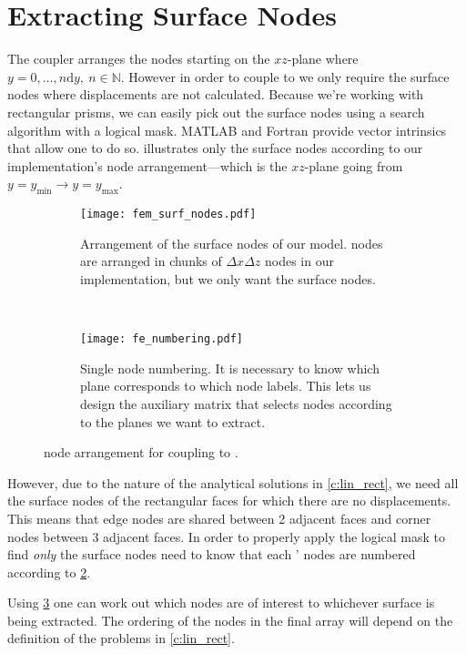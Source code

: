 \section{Extracting Surface Nodes}
The  coupler arranges the nodes starting on the $ xz $-plane where $ y = 0, \ldots, n \mathrm{d}y,~n\in \mathbb{N} $. However in order to couple  to  we only require the surface nodes where displacements are not calculated. Because we're working with rectangular prisms, we can easily pick out the surface nodes using a search algorithm with a logical mask. MATLAB and Fortran provide vector intrinsics that allow one to do so.  illustrates only the surface nodes according to our implementation's node arrangement---which is the $ xz $-plane going from $ y = y_{\textrm{min}} \to y = y_{\textrm{max}} $.
\begin{figure}
	\centering
	\begin{subfigure}[b]{0.45\linewidth}
		\centering
		\texttt{[image: fem\_surf\_nodes.pdf]}
		\caption[Surface nodes of our  model.]{Arrangement of the surface nodes of our  model.  nodes are arranged in chunks of $ \Delta x \Delta z $ nodes in our implementation, but we only want the surface nodes.}
		\label{f:fem_surf_nodes}
	\end{subfigure}
	~
	\begin{subfigure}[b]{0.45\linewidth}
		\centering
		\texttt{[image: fe\_numbering.pdf]}
		\caption[Single finite element node numbering.]{Single  node numbering. It is necessary to know which  plane corresponds to which node labels. This lets us design the auxiliary matrix that selects nodes according to the planes we want to extract.}
		\label{f:fe_numbering}
	\end{subfigure}
	\caption[Finite Element node arrangement for coupling to Discrete Dislocation Dynamics.]{ node arrangement for coupling to .}
	\label{f:fem_node_arr}
\end{figure}
However, due to the nature of the analytical solutions in \cref{c:lin_rect}, we need all the surface nodes of the rectangular faces for which there are no displacements. This means that edge nodes are shared between 2 adjacent faces and corner nodes between 3 adjacent faces. In order to properly apply the logical mask to find \emph{only} the surface nodes need to know that each ' nodes are numbered according to \cref{f:fe_numbering}.

Using \cref{f:fem_node_arr} one can work out which nodes are of interest to whichever surface is being extracted. The ordering of the nodes in the final array will depend on the definition of the problems in \cref{c:lin_rect}.

